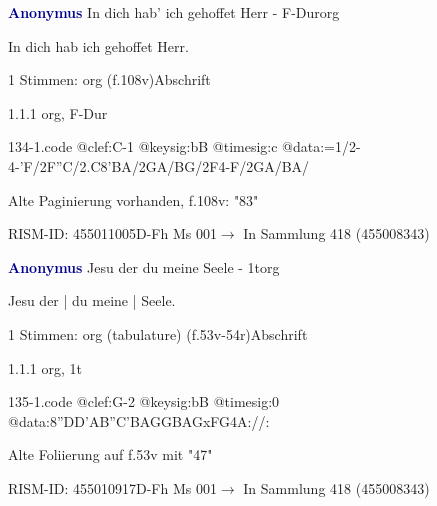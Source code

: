 \documentclass[twocolumn]{book}
\begin{document}
\par \vspace{7pt} \textcolor{darkblue}{\textbf{Anonymus  }}\hfillplus{\textbf{[134]}}\newline In dich hab' ich gehoffet Herr - F-Dur\newline org
\par \begin{itshape}[f.108v, heading:] In dich hab ich gehoffet Herr.\end{itshape} 
\par \textcolor{darkblue}{}  1 Stimmen: org  (f.108v)\newline Abschrift
\par 1.1.1  org, F-Dur  
\begin{filecontents*}{134-1.code}
@clef:C-1
@keysig:bB
@timesig:c
@data:=1/2-4-'F/2F''C/2.C{8'BA}/2GA/BG/2F4-F/2GA/BA/
\end{filecontents*}
\newline
%
\par Alte Paginierung vorhanden, f.108v: "83"
\par RISM-ID: 455011005\newline D-Fh  Ms 001\newline $\rightarrow$ In Sammlung 418 (455008343)
      
\par \vspace{7pt} \textcolor{darkblue}{\textbf{Anonymus  }}\hfillplus{\textbf{[135]}}\newline Jesu der du meine Seele - 1t\newline org
\par \begin{itshape}[f.53v, at left:] Jesu der | du meine | Seele.\end{itshape} 
\par \textcolor{darkblue}{}  1 Stimmen: org (tabulature)  (f.53v-54r)\newline Abschrift
\par 1.1.1  org, 1t  
\begin{filecontents*}{135-1.code}
@clef:G-2
@keysig:bB
@timesig:0
@data:{8''DD'AB}{''C'BAG}{GBAG}{xFG}4A://:
\end{filecontents*}
\newline
%
\par Alte Foliierung auf f.53v mit "47"
\par RISM-ID: 455010917\newline D-Fh  Ms 001\newline $\rightarrow$ In Sammlung 418 (455008343)
      
\end{document}
